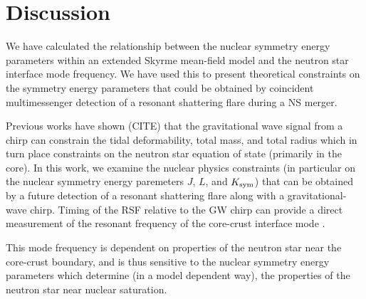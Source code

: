 \documentclass[fleqn,usenatbib]{mnras}
\begin{document}
\fi





\section{Discussion}
\hspace{\parindent}We have calculated the relationship between the nuclear symmetry energy parameters within an extended Skyrme mean-field model and the neutron star interface mode frequency. We have used this to present theoretical constraints on the symmetry energy parameters that could be obtained by coincident multimessenger detection of a resonant shattering flare during a NS merger. 

    \hspace{\parindent} Previous works have shown (CITE) that the gravitational wave signal from a chirp can constrain the tidal deformability, total mass, and total radius which in turn place constraints on the neutron star equation of state (primarily in the core). In this work, we examine the nuclear physics constraints (in particular on the nuclear symmetry energy paremeters $J$, $L$, and $K_{\rm sym}$) that can be obtained by a future detection of a resonant shattering flare along with a gravitational-wave chirp. Timing of the RSF relative to the GW chirp can provide a direct measurement of the resonant frequency of the core-crust interface mode  \citet{tsang2012resonant}. 
    
    This mode frequency is dependent on properties of the neutron star near the core-crust boundary, and is thus sensitive to the nuclear symmetry energy parameters which determine (in a model dependent way), the properties of the neutron star near nuclear saturation. 



\end{document}
